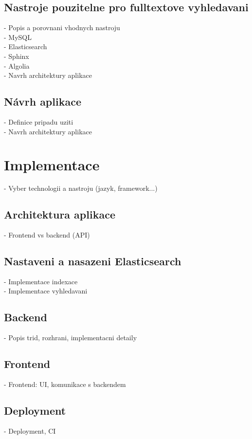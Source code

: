 \documentclass[FM,DP]{tulthesis}
\begin{document}
\section{Nastroje pouzitelne pro fulltextove vyhledavani}
- Popis a porovnani vhodnych nastroju\\
\hspace*{5mm}- MySQL\\
\hspace*{5mm}- Elasticsearch\\
\hspace*{5mm}- Sphinx\\
\hspace*{5mm}- Algolia\\
\hspace*{5mm}- Navrh architektury aplikace

\section{Návrh aplikace}
- Definice pripadu uziti\\
- Navrh architektury aplikace


\chapter{Implementace}
- Vyber technologii a nastroju (jazyk, framework...)

\section{Architektura aplikace}
- Frontend vs backend (API)

\section{Nastaveni a nasazeni Elasticsearch}
- Implementace indexace\\
- Implementace vyhledavani

\section{Backend}
- Popis trid, rozhrani, implementacni detaily

\section{Frontend}
- Frontend: UI, komunikace s backendem

\section{Deployment}
- Deployment, CI
\end{document}

